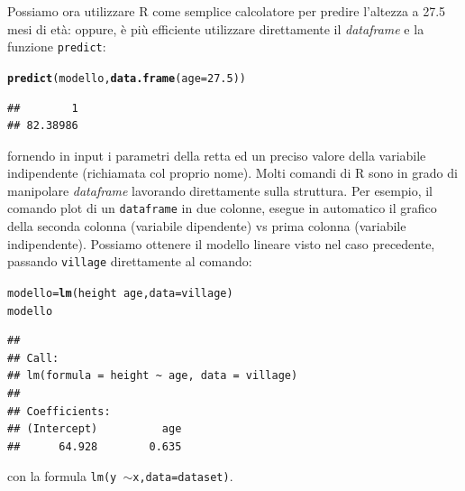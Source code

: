 \documentclass[onecolumn,12pt]{book}\usepackage[]{graphicx}\usepackage[]{color}
\makeatletter
\newcommand{\hlnum}[1]{\textcolor[rgb]{0.686,0.059,0.569}{#1}}%
\newcommand{\hlopt}[1]{\textcolor[rgb]{0,0,0}{#1}}%
\newcommand{\hlstd}[1]{\textcolor[rgb]{0.345,0.345,0.345}{#1}}%
\newcommand{\hlkwb}[1]{\textcolor[rgb]{0.69,0.353,0.396}{#1}}%
\newcommand{\hlkwc}[1]{\textcolor[rgb]{0.333,0.667,0.333}{#1}}%
\newcommand{\hlkwd}[1]{\textcolor[rgb]{0.737,0.353,0.396}{\textbf{#1}}}%
\newenvironment{kframe}{%
 \def\at@end@of@kframe{}%
 \ifinner\ifhmode%
  \def\at@end@of@kframe{\end{minipage}}%
  \begin{minipage}{\columnwidth}%
 \fi\fi%
 \def\FrameCommand##1{\hskip\@totalleftmargin \hskip-\fboxsep
 \colorbox{shadecolor}{##1}\hskip-\fboxsep
     \hskip-\linewidth \hskip-\@totalleftmargin \hskip\columnwidth}%
 \MakeFramed {\advance\hsize-\width
   \@totalleftmargin\z@ \linewidth\hsize
   \@setminipage}}%
 {\par\unskip\endMakeFramed%
 \at@end@of@kframe}
\newenvironment{knitrout}{}{} %
\newcommand{\mytilde}{$\sim$}
\makeatother
\begin{document}
Possiamo ora utilizzare \textsf{R} come semplice calcolatore per predire l'altezza a 27.5 mesi di et\`a:
oppure, \`e pi\`u  efficiente utilizzare direttamente il \emph{dataframe} e la funzione
\texttt{predict}:
\begin{knitrout}
\color{fgcolor}\begin{kframe}
\begin{alltt}
\hlkwd{predict}\hlstd{(modello,}\hlkwd{data.frame}\hlstd{(}\hlkwc{age}\hlstd{=}\hlnum{27.5}\hlstd{))}
\end{alltt}
\begin{verbatim}
##        1 
## 82.38986
\end{verbatim}
\end{kframe}
\end{knitrout}
fornendo in input i parametri della retta ed un preciso valore della variabile indipendente (richiamata col proprio nome).
Molti comandi di \textsf{R} sono in grado di manipolare \emph{dataframe}  lavorando direttamente sulla struttura. Per esempio, il comando plot di un \texttt{dataframe} in due colonne, esegue in automatico il grafico della seconda colonna (variabile dipendente) vs prima colonna (variabile indipendente).
Possiamo ottenere il modello lineare visto nel caso precedente, passando \texttt{village} direttamente al comando:
\begin{knitrout}
\color{fgcolor}\begin{kframe}
\begin{alltt}
\hlstd{modello}\hlkwb{=}\hlkwd{lm}\hlstd{(height}\hlopt{~}\hlstd{age,}\hlkwc{data}\hlstd{=village)}
\hlstd{modello}
\end{alltt}
\begin{verbatim}
## 
## Call:
## lm(formula = height ~ age, data = village)
## 
## Coefficients:
## (Intercept)          age  
##      64.928        0.635
\end{verbatim}
\end{kframe}
\end{knitrout}
con la formula \texttt{lm(y \mytilde x,data=dataset)}.
\end{document}
